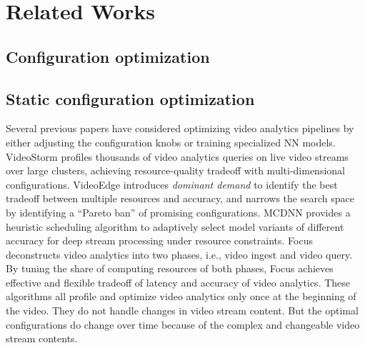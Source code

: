 \section{Related Works}
\label{Section: related_works}

\subsection{Configuration optimization} 
\subsection{Static configuration optimization}
Several previous papers have considered optimizing video analytics pipelines by either adjusting the configuration knobs or training specialized NN models. VideoStorm \cite{zhang2017videostorm} profiles thousands of video analytics queries on live video streams over large clusters, achieving resource-quality tradeoff with multi-dimensional configurations. VideoEdge \cite{hung2018videoedge} introduces \emph{dominant demand} to identify the best tradeoff between multiple resources and accuracy, and narrows the search space by identifying a ``Pareto ban'' of promising configurations. MCDNN \cite{han2016mcdnn} provides a heuristic scheduling algorithm to adaptively select model variants of different accuracy for deep stream processing under resource constraints. Focus \cite{hsieh2018focus} deconstructs video analytics into two phases, i.e., video ingest and video query. By tuning the share of computing resources of both phases, Focus achieves effective and flexible tradeoff of latency and accuracy of video analytics. These algorithms all profile and optimize video analytics only once at the beginning of the video. They do not handle changes in video stream content. But the optimal configurations do change over time because of the complex and changeable video stream contents.

